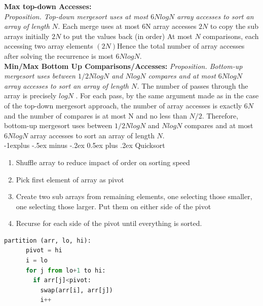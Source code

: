 \documentclass[letterpaper, 8pt]{extarticle}
\makeatletter
\renewcommand{\subsection}{\@startsection{subsection}{2}{0mm}%
                                {-1explus -.5ex minus -.2ex}%
                                {0.5ex plus .2ex}%
                                {\normalfont\small\bfseries}}
\makeatother
\begin{document}
\begin{multicols*}{4}
  \textbf{Max top-down Accesses:}\\
  \textit{Proposition. Top-down mergesort uses at most $6N log N$ array accesses to sort an array of length $N$.} Each merge uses at most 6N array accesses
  $2N$ to copy the sub arrays initially
  $2N$ to put the values back (in order)
  At most $N$ comparisons, each accessing two array elements $(2N)$Hence the total number of array accesses after solving the recurrence is most $6N log N$.\\
  \textbf{Min/Max Bottom Up Comparisons/Accesses:}
  \textit{Proposition. Bottom-up mergesort uses between $1/2N log N$ and $N log N$
  compares and at most $6N log N$ array accesses to sort an array of length $N$.}
  The number of passes through the array is precisely $log N$ . For each pass, by the same argument made as in the case of the
  top-down mergesort approach, the number of array accesses is exactly $6N$ and the number of compares is at most N and no less than $N/2$. Therefore, bottom-up mergesort uses between $1/2N log N$ and $N log N$ compares and at most $6N log N$ array accesses to sort an array of length
  $N$.\\

  \subsection{Quicksort}
  \begin{enumerate}
    \item Shuffle array to reduce impact of order on sorting speed
    \item Pick first element of array as pivot
    \item Create two sub arrays from remaining elements, one selecting those smaller,
          one selecting those larger. Put them on either side of the pivot
    \item Recurse for each side of the pivot until everything is sorted.
  \end{enumerate}
  \begin{lstlisting}[language=Python, breaklines=true, postbreak=\mbox{\textcolor{red}{$\hookrightarrow$}\space}]
    partition (arr, lo, hi):
      pivot = hi
      i = lo
      for j from lo+1 to hi:
        if arr[j]<pivot:
          swap(arr[i], arr[j])
          i++


\end{lstlisting}
\end{multicols*}
\end{document}
